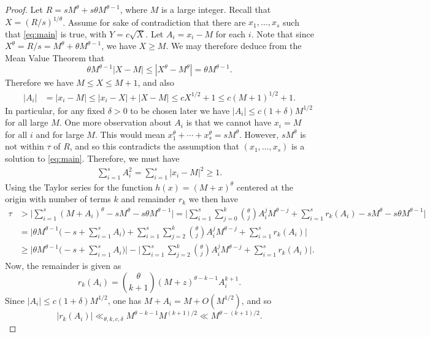 \documentclass[11pt,reqno]{amsart}
\numberwithin{equation}{section}
\begin{document}
\begin{proof} Let $R = sM^{\theta}+s\theta M^{\theta-1}$, where $M$ is a large integer. Recall that $X = (R/s)^{1/\theta}$. Assume for sake of contradiction that there are $x_1,\ldots, x_s$ such that \eqref{eq:main} is true, with $Y = c\sqrt{X}$. Let $A_i = x_i-M$ for each $i$. Note that since $X^{\theta}= R/s = M^{\theta}+\theta M^{\theta-1}$, we have $X \geq M$. We may therefore deduce from the Mean Value Theorem that 
\[ \theta M^{\theta-1}|X-M| \leq |X^{\theta}-M^{\theta}| = \theta M^{\theta-1}. \]
Therefore we have $M \leq X \leq M+1$, and also 
\begin{align*} 
|A_i| & = |x_i-M| \leq |x_i-X|+|X-M| \leq  cX^{1/2} +1 \leq c(M+1)^{1/2}+1.
\end{align*}
In particular, for any fixed $\delta > 0$ to be chosen later we have $|A_i| \leq c(1+\delta)M^{1/2}$ for all large $M$. 
One more observation about $A_i$ is that we cannot have $x_i = M$ for all $i$ and for large $M$. This would mean $x_1^{\theta}+\cdots +x_s^{\theta} = sM^{\theta}$. However, $sM^{\theta}$ is not within $\tau$ of $R$, and so this contradicts the assumption that $(x_1,\ldots,x_s)$ is a solution to \eqref{eq:main}. Therefore, we must have 
\begin{align} \label{eq:A_i}
\sum_{i=1}^s A_i^2 = \sum_{i=1}^s |x_i-M|^2 \geq 1. 
\end{align}
Using the Taylor series for the function $h(x) = (M+x)^{\theta}$ centered at the origin with number of terms $k$ and remainder $r_k$ we then have 
\begin{equation} \label{eq:comp}
\begin{aligned}
\tau & > \Big|\sum_{i=1}^s (M+A_i)^{\theta}-sM^{\theta}-s\theta M^{\theta-1}\Big| = \Big|\sum_{i=1}^s \sum_{j=0}^k \binom{\theta}{j}A_i^{j}M^{\theta-j}+\sum_{i=1}^s r_k(A_i)-sM^{\theta}-s\theta M^{\theta-1}\Big| 
\\ & = \Big|\theta M^{\theta-1}\big(-s+\sum_{i=1}^s A_i\big)+\sum_{i=1}^s \sum_{j=2}^k \binom{\theta}{j}A_i^jM^{\theta-j}+\sum_{i=1}^s r_k(A_i)\Big| 
\\ & \geq \Big|\theta M^{\theta-1}\big(-s+\sum_{i=1}^s A_i\big)\Big|-\Big|\sum_{i=1}^s \sum_{j=2}^k \binom{\theta}{j}A_i^jM^{\theta-j}+\sum_{i=1}^s r_k(A_i)\Big|. 
\end{aligned}
\end{equation}
Now, the remainder is given as 
\[r_k(A_i) = \binom{\theta}{k+1}(M+z)^{\theta-k-1}A_i^{k+1}. \] Since $|A_i| \leq c(1+\delta)M^{1/2}$, one has $M+A_i = M +O(M^{1/2})$, and so 
\[ |r_k(A_i)| \ll_{\theta,k,c,\delta} M^{\theta-k-1}M^{(k+1)/2} \ll M^{\theta-(k+1)/2}. \] 

\end{proof}
\end{document}
